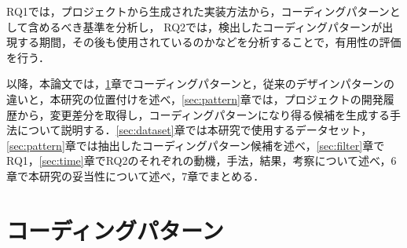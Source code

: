 \documentclass[submit,techrep,noauthor]{ipsj}
\newcommand{\todo}[1]{\colorbox{yellow}{{\bf TODO}:}{\color{red} {\textbf{[#1]}}}}
\begin{document}
RQ1では，プロジェクトから生成された実装方法から，コーディングパターンとして含めるべき基準を分析し，
RQ2では，検出したコーディングパターンが出現する期間，その後も使用されているのかなどを分析することで，有用性の評価を行う．

以降，本論文では，\ref{sec:related}章でコーディングパターンと，従来のデザインパターンの違いと，本研究の位置付けを述べ，\ref{sec:pattern}章では，プロジェクトの開発履歴から，変更差分を取得し，コーディングパターンになり得る候補を生成する手法について説明する．\ref{sec:dataset}章では本研究で使用するデータセット，\ref{sec:pattern}章では抽出したコーディングパターン候補を述べ，\ref{sec:filter}章でRQ1，\ref{sec:time}章でRQ2のそれぞれの動機，手法，結果，考察について述べ，6章で本研究の妥当性について述べ，7章でまとめる．

\section{コーディングパターン}\label{sec:related}

\end{document}
